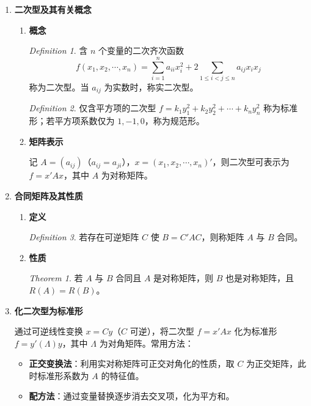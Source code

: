 \documentclass[UTF8]{ctexart}
\theoremstyle{remark}
\newtheorem{theorem}{Theorem}
\newtheorem{definition}{Definition}
\begin{document}
\begin{enumerate}
	\item \textbf{二次型及其有关概念}
	\begin{enumerate}
		\item \textbf{概念}
		\begin{definition}
			含 \(n\) 个变量的二次齐次函数
			\[
			f(x_1, x_2, \cdots, x_n) = \sum_{i=1}^n a_{ii}x_i^2 + 2\sum_{1\leq i<j\leq n}a_{ij}x_ix_j
			\]
			称为二次型。当 \(a_{ij}\) 为实数时，称实二次型。
		\end{definition}
		\begin{definition}
			仅含平方项的二次型 \(f = k_1y_1^2 + k_2y_2^2 + \cdots + k_ny_n^2\) 称为标准形；若平方项系数仅为 \(1, -1, 0\)，称为规范形。
		\end{definition}
		\item \textbf{矩阵表示}
		
		记 \(A = (a_{ij})\)（\(a_{ij} = a_{ji}\)），\(x = (x_1, x_2, \cdots, x_n)'\)，则二次型可表示为 \(f = x'Ax\)，其中 \(A\) 为对称矩阵。
	\end{enumerate}
	
	\item \textbf{合同矩阵及其性质}
	\begin{enumerate}
		\item \textbf{定义}
		\begin{definition}
			若存在可逆矩阵 \(C\) 使 \(B = C'AC\)，则称矩阵 \(A\) 与 \(B\) 合同。
		\end{definition}
		\item \textbf{性质}
		\begin{theorem}
			若 \(A\) 与 \(B\) 合同且 \(A\) 是对称矩阵，则 \(B\) 也是对称矩阵，且 \(R(A) = R(B)\)。
		\end{theorem}
	\end{enumerate}
	
	\item \textbf{化二次型为标准形}
	
	通过可逆线性变换 \(x = Cy\)（\(C\) 可逆），将二次型 \(f = x'Ax\) 化为标准形 \(f = y'(\Lambda)y\)，其中 \(\Lambda\) 为对角矩阵。常用方法：
	\begin{itemize}
		\item \textbf{正交变换法}：利用实对称矩阵可正交对角化的性质，取 \(C\) 为正交矩阵，此时标准形系数为 \(A\) 的特征值。
		\item \textbf{配方法}：通过变量替换逐步消去交叉项，化为平方和。
	\end{itemize}


\end{enumerate}
\end{document}
